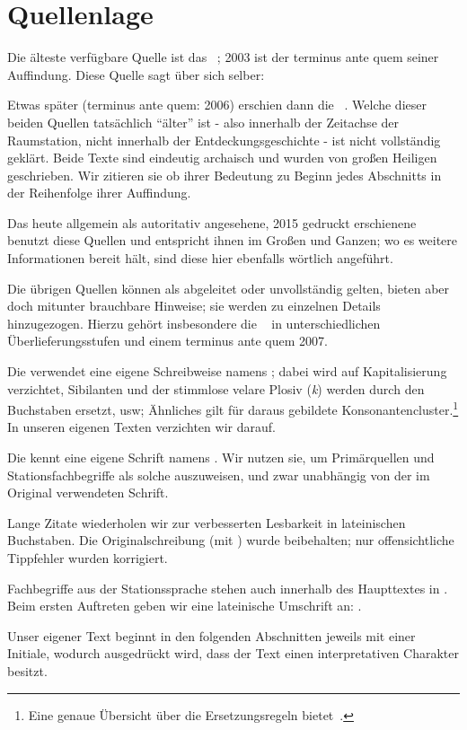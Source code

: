 \section*{Quellenlage}
\fancyhead[LO]{}

Die älteste verfügbare Quelle ist das ~\cite{cbasestarbasemanual}; 2003 ist der terminus ante quem seiner Auffindung. Diese Quelle sagt über sich selber:

Etwas später (terminus ante quem: 2006) erschien dann die ~\cite{ctour}. Welche dieser beiden Quellen tatsächlich "`älter"' ist - also innerhalb der Zeitachse der Raumstation, nicht innerhalb der Entdeckungsgeschichte - ist nicht vollständig geklärt. Beide Texte sind eindeutig archaisch und wurden von großen Heiligen geschrieben.  Wir zitieren sie ob ihrer Bedeutung zu Beginn jedes Abschnitts in der Reihenfolge ihrer Auffindung.

Das heute allgemein als autoritativ angesehene, 2015 gedruckt erschienene ~\cite{cbasebook} benutzt diese Quellen und entspricht ihnen im Großen und Ganzen; wo es weitere Informationen bereit hält, sind diese hier ebenfalls wörtlich angeführt. 

Die übrigen Quellen können als abgeleitet oder unvollständig gelten, bieten aber doch mitunter brauchbare Hinweise; sie werden zu einzelnen Details hinzugezogen. Hierzu gehört  insbesondere die ~\cite{cbasepressemap} in unterschiedlichen Überlieferungsstufen und einem terminus ante quem 2007. 

Die  verwendet eine eigene Schreibweise namens  ; dabei wird auf Kapitalisierung verzichtet,  Sibilanten und der stimmlose velare Plosiv (\emph{k}) werden durch den Buchstaben  ersetzt, usw; Ähnliches gilt für daraus gebildete Konsonantencluster.\footnote{Eine genaue Übersicht über die Ersetzungsregeln bietet~\cite[S.~46]{cbasebook}.} In unseren eigenen Texten verzichten wir darauf.

Die  kennt eine eigene Schrift namens . Wir nutzen sie, um Primärquellen und Stationsfachbegriffe als solche auszuweisen, und zwar unabhängig von der im Original verwendeten Schrift. 

Lange Zitate wiederholen wir zur verbesserten Lesbarkeit in lateinischen Buchstaben. Die Originalschreibung (mit ) wurde beibehalten; nur offensichtliche Tippfehler wurden korrigiert. 

Fachbegriffe aus der Stationssprache stehen auch innerhalb des Haupttextes in . Beim ersten Auftreten geben wir eine lateinische Umschrift an: . 

Unser eigener Text beginnt in den folgenden Abschnitten jeweils mit einer Initiale, wodurch ausgedrückt wird, dass der Text einen interpretativen Charakter besitzt.



